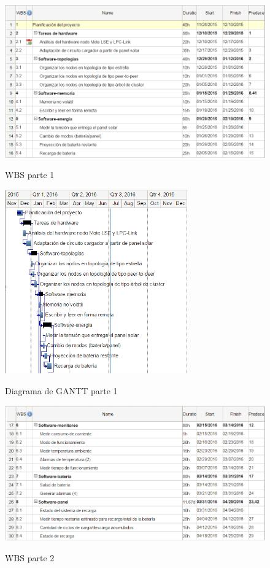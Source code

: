 \begin{figure}[h!]
	\centering
    \includegraphics[width=1\textwidth]{./Figures/WBS1.PNG}
	\label{fig:WBS1}
	\caption{WBS parte 1}
\end{figure}

\begin{figure}[h!]
	\centering
    \includegraphics[width=0.7\textwidth]{./Figures/gantt1.PNG}
	\label{fig:gantt1}
	\caption{Diagrama de GANTT parte 1}
\end{figure}

\begin{figure}[h!]
	\centering
    \includegraphics[width=1\textwidth]{./Figures/WBS2.PNG}
	\label{fig:WBS2}
	\caption{WBS parte 2}
\end{figure}


